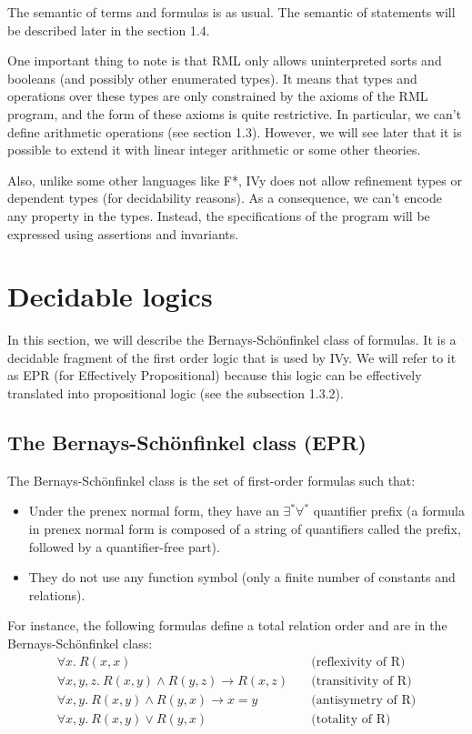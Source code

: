 \documentclass[11pt,a4paper,oldfontcommands]{memoir}
\begin{document}
    The semantic of terms and formulas is as usual. The semantic of statements will be described later in the section 1.4.

    One important thing to note is that RML only allows uninterpreted sorts and booleans (and possibly other enumerated types).
    It means that types and operations over these types are only constrained by the axioms of the RML program,
    and the form of these axioms is quite restrictive.
    In particular, we can't define arithmetic operations (see section 1.3).
    However, we will see later that it is possible to extend it with linear integer arithmetic or some other theories.

    Also, unlike some other languages like F*, IVy does not allow refinement types or dependent types (for decidability reasons).
    As a consequence, we can't encode any property in the types.
    Instead, the specifications of the program will be expressed using assertions and invariants.

    \section{Decidable logics}

    In this section, we will describe the Bernays-Schönfinkel class of formulas. It is a decidable fragment of the first order logic that is used by IVy.
    We will refer to it as EPR (for Effectively Propositional) because this logic can be effectively translated into propositional logic (see the subsection 1.3.2).

        \subsection{The Bernays-Schönfinkel class (EPR)}

        The Bernays-Schönfinkel class is the set of first-order formulas such that:
        \begin{itemize}
            \item Under the prenex normal form, they have an \(\exists^*\forall^*\) quantifier prefix
            (a formula in prenex normal form is composed of a string of quantifiers called the prefix, followed by a quantifier-free part).
            \item They do not use any function symbol (only a finite number of constants and relations).
        \end{itemize}

        For instance, the following formulas define a total relation order and are in the Bernays-Schönfinkel class:
        \begin{align*}
            \forall x. \ R(x,x) &\quad\text{(reflexivity of R)}\\
            \forall x,y,z. \ R(x,y) \land R(y,z) \rightarrow R(x,z) &\quad\text{(transitivity of R)}\\
            \forall x,y. \ R(x,y) \land R(y,x) \rightarrow x=y &\quad\text{(antisymetry of R)}\\
            \forall x,y. \ R(x,y) \lor R(y,x) &\quad\text{(totality of R)}
        \end{align*}
\end{document}
